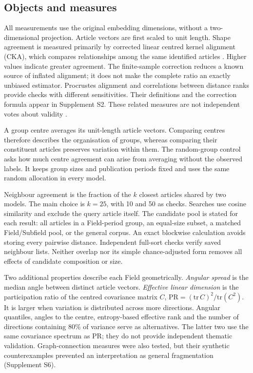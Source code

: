 \documentclass[12pt]{article}
\begin{document}
\subsection{Objects and measures}
All measurements use the original embedding dimensions, without a two-dimensional projection. Article vectors are first scaled to unit length. Shape agreement is measured primarily by corrected linear centred kernel alignment (CKA), which compares relationships among the same identified articles \citep{pmlr-v97-kornblith19a,refa961d84a4e}. Higher values indicate greater agreement. The finite-sample correction reduces a known source of inflated alignment; it does not make the complete ratio an exactly unbiased estimator. Procrustes alignment and correlations between distance ranks provide checks with different sensitivities. Their definitions and the correction formula appear in Supplement S2. These related measures are not independent votes about validity \citep{NEURIPS2021_252a3dba,pmlr-v285-williams24a}.

A group centre averages its unit-length article vectors. Comparing centres therefore describes the organisation of groups, whereas comparing their constituent articles preserves variation within them. The random-group control asks how much centre agreement can arise from averaging without the observed labels. It keeps group sizes and publication periods fixed and uses the same random allocation in every model.

Neighbour agreement is the fraction of the $k$ closest articles shared by two models. The main choice is $k=25$, with 10 and 50 as checks. Searches use cosine similarity and exclude the query article itself. The candidate pool is stated for each result: all articles in a Field-period group, an equal-size subset, a matched Field/Subfield pool, or the general corpus. An exact blockwise calculation avoids storing every pairwise distance. Independent full-sort checks verify saved neighbour lists. Neither overlap nor its simple chance-adjusted form removes all effects of candidate composition or size.

Two additional properties describe each Field geometrically. \emph{Angular spread} is the median angle between distinct article vectors. \emph{Effective linear dimension} is the participation ratio of the centred covariance matrix $C$, $\mathrm{PR}=(\mathrm{tr}\,C)^2/\mathrm{tr}(C^2)$. It is larger when variation is distributed across more directions. Angular quantiles, angles to the centre, entropy-based effective rank and the number of directions containing 80\% of variance serve as alternatives. The latter two use the same covariance spectrum as PR; they do not provide independent thematic validation. Graph-connection measures were also tested, but their synthetic counterexamples prevented an interpretation as general fragmentation (Supplement S6).
\end{document}

